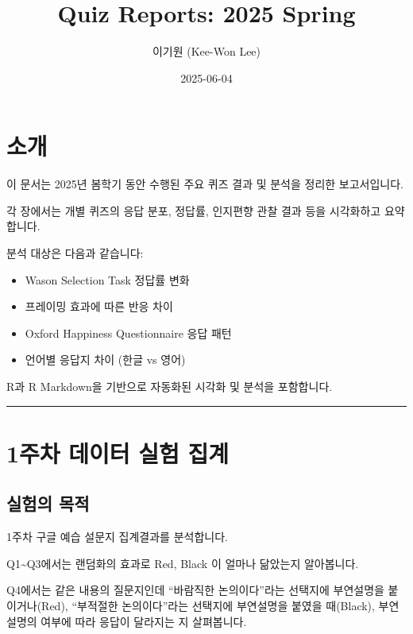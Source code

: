 \documentclass[
]{book}
\title{Quiz Reports: 2025 Spring}
\author{이기원 (Kee-Won Lee)}
\date{2025-06-04}
\providecommand{\tightlist}{%
  \setlength{\itemsep}{0pt}\setlength{\parskip}{0pt}}
\begin{document}
\maketitle

{
\setcounter{tocdepth}{1}
\tableofcontents
}
\chapter*{소개}\label{uxc18cuxac1c}

이 문서는 2025년 봄학기 동안 수행된 주요 퀴즈 결과 및 분석을 정리한 보고서입니다.

각 장에서는 개별 퀴즈의 응답 분포, 정답률, 인지편향 관찰 결과 등을 시각화하고 요약합니다.

분석 대상은 다음과 같습니다:

\begin{itemize}
\tightlist
\item
  Wason Selection Task 정답률 변화
\item
  프레이밍 효과에 따른 반응 차이
\item
  Oxford Happiness Questionnaire 응답 패턴
\item
  언어별 응답지 차이 (한글 vs 영어)
\end{itemize}

R과 R Markdown을 기반으로 자동화된 시각화 및 분석을 포함합니다.

\begin{center}\rule{0.5\linewidth}{0.5pt}\end{center}

\chapter{1주차 데이터 실험 집계}\label{uxc8fcuxcc28-uxb370uxc774uxd130-uxc2e4uxd5d8-uxc9d1uxacc4}

\section{실험의 목적}\label{uxc2e4uxd5d8uxc758-uxbaa9uxc801}

1주차 구글 예습 설문지 집계결과를 분석합니다.

Q1\textasciitilde Q3에서는 랜덤화의 효과로 Red, Black 이 얼마나 닮았는지 알아봅니다.

Q4에서는 같은 내용의 질문지인데 ``바람직한 논의이다''라는 선택지에 부연설명을 붙이거나(Red), ``부적절한 논의이다''라는 선택지에 부연설명을 붙였을 때(Black), 부연설명의 여부에 따라 응답이 달라지는 지 살펴봅니다.
\end{document}
